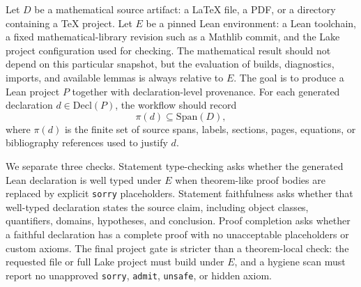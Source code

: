\documentclass{article}
\newcommand{\lean}{Lean\xspace}
\newcommand{\mathlib}{Mathlib\xspace}
\begin{document}
Let $D$ be a mathematical source artifact: a \LaTeX{} file, a PDF, or a directory containing a \TeX{} project.
Let $E$ be a pinned \lean environment: a Lean toolchain, a fixed mathematical-library revision such as a \mathlib commit, and the Lake project configuration used for checking.
The mathematical result should not depend on this particular snapshot, but the evaluation of builds, diagnostics, imports, and available lemmas is always relative to $E$.
The goal is to produce a \lean project $P$ together with declaration-level provenance.
For each generated declaration $d \in \mathrm{Decl}(P)$, the workflow should record
\[
  \pi(d) \subseteq \mathrm{Span}(D),
\]
where $\pi(d)$ is the finite set of source spans, labels, sections, pages, equations, or bibliography references used to justify $d$.

We separate three checks.
Statement type-checking asks whether the generated \lean declaration is well typed under $E$ when theorem-like proof bodies are replaced by explicit \texttt{sorry} placeholders.
Statement faithfulness asks whether that well-typed declaration states the source claim, including object classes, quantifiers, domains, hypotheses, and conclusion.
Proof completion asks whether a faithful declaration has a complete proof with no unacceptable placeholders or custom axioms.
The final project gate is stricter than a theorem-local check: the requested file or full Lake project must build under $E$, and a hygiene scan must report no unapproved \texttt{sorry}, \texttt{admit}, \texttt{unsafe}, or hidden axiom.
\end{document}
